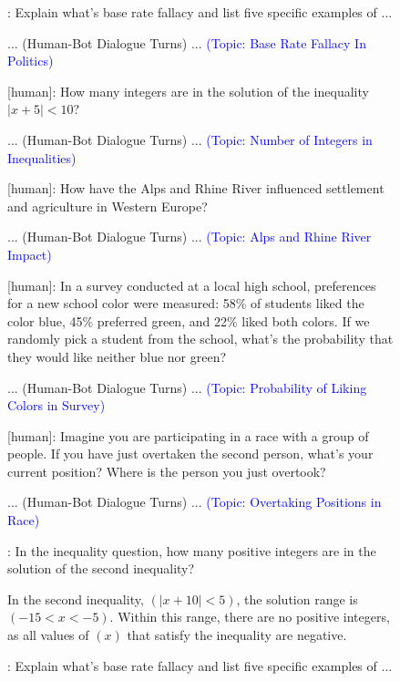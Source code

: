 \begin{figure}[htbp]
\small
\begin{tcolorbox}[left=3pt,right=3pt,top=3pt,bottom=3pt,title=\textbf{Conversation History:}]
[human]: Explain what's base rate fallacy and list five specific examples of ...

... (Human-Bot Dialogue Turns) ... \textcolor{blue}{(Topic: Base Rate Fallacy In Politics)}


[human]: How many integers are in the solution of the inequality $|x + 5| < 10$?

... (Human-Bot Dialogue Turns) ... \textcolor{blue}{(Topic: Number of Integers in Inequalities)}

[human]: How have the Alps and Rhine River influenced settlement and agriculture in Western Europe?

... (Human-Bot Dialogue Turns) ... \textcolor{blue}{(Topic: Alps and Rhine River Impact)}

[human]: In a survey conducted at a local high school, preferences for a new school color were measured: 58\% of students liked the color blue, 45\% preferred green, and 22\% liked both colors. If we randomly pick a student from the school, what's the probability that they would like neither blue nor green?

... (Human-Bot Dialogue Turns) ... \textcolor{blue}{(Topic: Probability of Liking Colors in Survey)}

[human]: Imagine you are participating in a race with a group of people. If you have just overtaken the second person, what's your current position? Where is the person you just overtook?

... (Human-Bot Dialogue Turns) ... \textcolor{blue}{(Topic: Overtaking Positions in Race)}
\end{tcolorbox}
\begin{tcolorbox}[left=3pt,right=3pt,top=3pt,bottom=3pt,title=\textbf{Question:}]
[human]: In the inequality question, how many positive integers are in the solution of the second inequality?
\end{tcolorbox}
\begin{tcolorbox}[left=3pt,right=3pt,top=3pt,bottom=3pt,title=\textbf{Ground-Truth Answer:}]
In the second inequality, $(|x + 10| < 5)$, the solution range is $(-15 < x < -5)$. Within this range, there are no positive integers, as all values of $(x)$ that satisfy the inequality are negative.
\end{tcolorbox}
\begin{tcolorbox}[left=3pt,right=3pt,top=3pt,bottom=3pt,title=\textbf{Retrieved Memory (Session-Level):}]
[human]: Explain what's base rate fallacy and list five specific examples of ...


\end{tcolorbox}
\end{figure}
